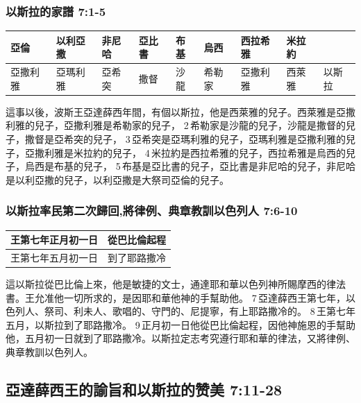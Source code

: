 \subsubsection{以斯拉的家譜 7:1-5}
\begin{table}[H]
\centering 
\begin{tabular}{p{1.5cm}|p{1.5cm}|p{1.2cm}|p{1.2cm}|p{1.2cm}|p{1.2cm}|p{1.5cm}|p{1.2cm}|p{1.2cm}}\hline\hline
亞倫 & 以利亞撒 &非尼哈& 亞比書& 布基 & 烏西& 西拉希雅 &米拉約&\\\hline
亞撒利雅& 亞瑪利雅&亞希突 &撒督 & 沙龍 & 希勒家 &亞撒利雅& 西萊雅 &以斯拉\\\hline
\end{tabular}
\end{table}
這事以後，波斯王亞達薛西年間，有個以斯拉，他是西萊雅的兒子。西萊雅是亞撒利雅的兒子，亞撒利雅是希勒家的兒子， 2 希勒家是沙龍的兒子，沙龍是撒督的兒子，撒督是亞希突的兒子， 3 亞希突是亞瑪利雅的兒子，亞瑪利雅是亞撒利雅的兒子，亞撒利雅是米拉約的兒子， 4 米拉約是西拉希雅的兒子，西拉希雅是烏西的兒子，烏西是布基的兒子， 5 布基是亞比書的兒子，亞比書是非尼哈的兒子，非尼哈是以利亞撒的兒子，以利亞撒是大祭司亞倫的兒子。

\subsubsection{以斯拉率民第二次歸回,將律例、典章教訓以色列人 7:6-10}
\begin{table}
\centering 
\begin{tabular}{p{3.5cm}|p{2.5cm}}\hline\hline
王第七年正月初一日&從巴比倫起程  \\\hline
王第七年五月初一日 &到了耶路撒冷 \\\hline
\end{tabular}
\end{table}
這以斯拉從巴比倫上來，他是敏捷的文士，通達耶和華以色列神所賜摩西的律法書。王允准他一切所求的，是因耶和華他神的手幫助他。 7 亞達薛西王第七年，以色列人、祭司、利未人、歌唱的、守門的、尼提寧，有上耶路撒冷的。 8 王第七年五月，以斯拉到了耶路撒冷。 9 正月初一日他從巴比倫起程，因他神施恩的手幫助他，五月初一日就到了耶路撒冷。以斯拉定志考究遵行耶和華的律法，又將律例、典章教訓以色列人。

\subsection{亞達薛西王的諭旨和以斯拉的赞美 7:11-28}
